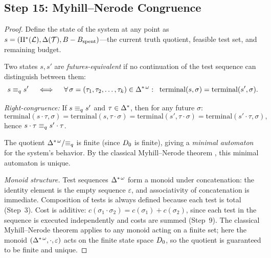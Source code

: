
\subsection{Step 15: Myhill--Nerode Congruence}\label{app:step15}

\begin{proof}
Define the state of the system at any point as
$s = (\Pi^*(\mathcal{L}), \Delta(\mathcal{T}), B - B_{\mathrm{spent}})$---the current
truth quotient, feasible test set, and remaining budget.

Two states $s, s'$ are \emph{futures-equivalent} if no continuation of
the test sequence can distinguish between them:
\[
  s \equiv_q s' \quad\iff\quad
  \forall\, \sigma = (\tau_1, \tau_2, \ldots, \tau_k) \in \Delta^{*\,\omega}:\;\;
    \mathrm{terminal}(s, \sigma) = \mathrm{terminal}(s', \sigma).
\]

\emph{Right-congruence:}  If $s \equiv_q s'$ and $\tau \in \Delta^*$, then
for any future $\sigma$:
\[
  \mathrm{terminal}(s \cdot \tau, \sigma)
    = \mathrm{terminal}(s, \tau \cdot \sigma)
    = \mathrm{terminal}(s', \tau \cdot \sigma)
    = \mathrm{terminal}(s' \cdot \tau, \sigma),
\]
hence $s \cdot \tau \equiv_q s' \cdot \tau$.

The quotient $\Delta^{*\,\omega} / {\equiv_q}$ is finite (since $D_0$ is
finite), giving a \emph{minimal automaton} for the system's behavior.
By the classical Myhill--Nerode theorem \citep{myhill1957,nerode1958}, this minimal automaton is unique.

\emph{Monoid structure.}  Test sequences $\Delta^{*\,\omega}$ form a
monoid under concatenation: the identity element is the empty sequence
$\varepsilon$, and associativity of concatenation is immediate.
Composition of tests is always defined because each test is total
(Step~3).  Cost is additive: $c(\sigma_1 \cdot \sigma_2) =
c(\sigma_1) + c(\sigma_2)$, since each test in the sequence is executed
independently and costs are summed (Step~9).  The classical
Myhill--Nerode theorem \citep{hopcroft1979} applies to any monoid acting on a finite set;
here the monoid $(\Delta^{*\,\omega}, \cdot, \varepsilon)$ acts on the
finite state space $D_0$, so the quotient is guaranteed to be
finite and unique.

\end{proof}

